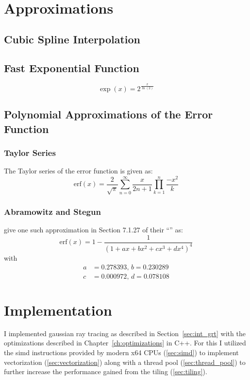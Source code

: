 \documentclass[a4paper, 11pt]{memoir}
\newcommand*{\erf}{\text{erf}}
\begin{document}
    \chapter{Approximations}
    \section{Cubic Spline Interpolation}

    \section{Fast Exponential Function}
    \cite{fast_exp}
    \begin{equation}
        \exp{(x)} = 2^{\frac{x}{\ln{(2)}}}
    \end{equation}
    
    \section{Polynomial Approximations of the Error Function}
    \subsection{Taylor Series}
    The Taylor series of the error function is given as:
    \begin{equation}
        \erf{(x)} = \frac{2}{\sqrt{\pi}} \sum_{n = 0}^\infty \frac{x}{2n + 1} \prod_{k = 1}^n \frac{-x^2}{k}
    \end{equation}
    \subsection{Abramowitz and Stegun}
    \citeauthor{AbraSteg72} give one such approximation in Section 7.1.27 of their \enquote{}\cite{AbraSteg72} as:
    \begin{equation}
        \erf{(x)} = 1 - \frac{1}{(1 + ax + bx^2 + cx^3 + dx^4)^4}
    \end{equation}
    with
    \begin{align*}
        a &= 0.278393,\,
        b = 0.230289\\
        c &= 0.000972,\,
        d = 0.078108
    \end{align*}
    
    \chapter{Implementation}
    \label{ch:implementation}
    I implemented gaussian ray tracing as described in Section~\ref{sec:int_grt} with the optimizations described in Chapter~\ref{ch:optimizations} in C++. For this I utilized the \gls{simd}
    instructions provided by modern x64 CPUs (\ref{sec:simd}) to implement vectorization (\ref{sec:vectorization}) along with a thread pool (\ref{sec:thread_pool}) to further increase
    the performance gained from the tiling (\ref{sec:tiling}).
\end{document}
